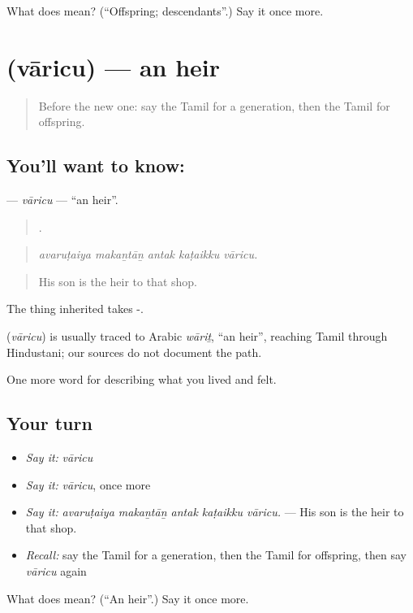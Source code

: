 \begin{tcolorbox}[breakable,colback=teal!4,colframe=teal!35!black,title={Before you move on}]
What does  mean? (\textquotedblleft{}Offspring; descendants\textquotedblright{}.) Say it once more.
\end{tcolorbox}
\section[\texorpdfstring{\ta{வாரிசு} (vāricu)}{வாரிசு (vāricu)}]{ (vāricu) — an heir}

\label{lesson:TA-C494-varicu}



\begin{quote}
Before the new one: say the Tamil for a generation, then the Tamil for offspring.
\end{quote}

\subsection*{You'll want to know: }
\textbf{} — \emph{vāricu} — \textquotedblleft{}an heir\textquotedblright{}.

\begin{quote}
    .
\end{quote}

\begin{quote}
\emph{avaruṭaiya makaṉtāṉ antak kaṭaikku vāricu.}
\end{quote}

\begin{quote}
His son is the heir to that shop.
\end{quote}

The thing inherited takes -.

\begin{cousinweb}
\textbf{} (\emph{vāricu}) is usually traced to Arabic \emph{wāriṯ}, \textquotedblleft{}an heir\textquotedblright{}, reaching Tamil through Hindustani; our sources do not document the path.
\end{cousinweb}

\begin{grammarlens}[title={What you've built}]
One more word for describing what you lived and felt.
\end{grammarlens}

\subsection*{Your turn}
\begin{itemize}
\raggedright
  \item \emph{Say it:} \emph{vāricu}
  \item \emph{Say it:} \emph{vāricu}, once more
  \item \emph{Say it:} \emph{avaruṭaiya makaṉtāṉ antak kaṭaikku vāricu.} — His son is the heir to that shop.
  \item \emph{Recall:} say the Tamil for a generation, then the Tamil for offspring, then say \emph{vāricu} again
\end{itemize}

\begin{tcolorbox}[breakable,colback=teal!4,colframe=teal!35!black,title={Before you move on}]
What does  mean? (\textquotedblleft{}An heir\textquotedblright{}.) Say it once more.
\end{tcolorbox}
